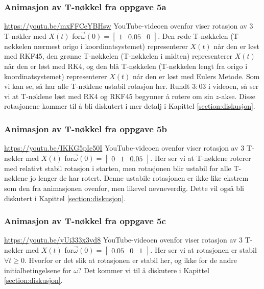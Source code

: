 \subsubsection{Animasjon av T-nøkkel fra oppgave 5a}
\label{subseq:oppgavea}
\href{https://youtu.be/mxFFCeYBHsw}{https://youtu.be/mxFFCeYBHsw}\newline\newline 
YouTube-videoen ovenfor viser rotasjon av $3$ T-nøkler med $X(t)$ for\newline $\vec{\omega}(0)=\begin{bmatrix}1&0.05&0\end{bmatrix}.$ Den røde T-nøkkelen (T-nøkkelen nærmest origo i koordinatsystemet) representerer $X(t)$ når den er løst med RKF45, den grønne T-nøkkelen (T-nøkkelen i midten) representerer $X(t)$ når den er løst med RK4, og den blå T-nøkkelen (T-nøkkelen lengt fra origo i koordinatsystemet) representerer $X(t)$ når den er løst med Eulers Metode. Som vi kan se, så har alle T-nøklene ustabil rotasjon her. Rundt $3:03$ i videoen, så ser vi at T-nøklene løst med RK4 og RKF45 begynner å rotere om sin $z$-akse. Disse rotasjonene kommer til å bli diskutert i mer detalj i Kapittel \ref{section:diskusjon}.

\subsubsection{Animasjon av T-nøkkel fra oppgave 5b}
\label{subseq:oppgaveb}
\href{https://youtu.be/IKKG5pIe50I}{https://youtu.be/IKKG5pIe50I}\newline\newline
YouTube-videoen ovenfor viser rotasjon av $3$ T-nøkler med $X(t)$ for\newline $\vec{\omega}(0) = \begin{bmatrix}0 & 1 & 0.05 \end{bmatrix}$. Her ser vi at T-nøklene roterer med relativt stabil rotasjon i starten, men rotasjonen blir ustabil for alle T-nøklene jo lenger de har rotert. Denne ustabile rotasjonen er ikke like ekstrem som den fra animasjonen ovenfor, men likevel nevneverdig. Dette vil også bli diskutert i Kapittel \ref{section:diskusjon}.

\subsubsection{Animasjon av T-nøkkel fra oppgave 5c}
\label{subseq:oppgavec}
\href{https://youtu.be/yUi333x3vd8}{https://youtu.be/yUi333x3vd8}\newline\newline
YouTube-videoen ovenfor viser rotasjon av $3$ T-nøkler med $X(t)$ for\newline $\vec{\omega}(0) = \begin{bmatrix}0.05 & 0 & 1 \end{bmatrix}$. Her ser vi at rotasjonen er stabil $\forall t\geq 0.$ Hvorfor er det slik at rotasjonen er stabil her, og ikke for de andre initialbetingelsene for $\omega$? Det kommer vi til å diskutere i Kapittel \ref{section:diskusjon}. 